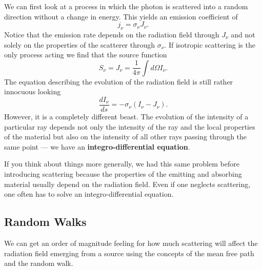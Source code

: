 We can first look at a process in which the photon is scattered into
a random direction without a change in energy.  This yields an
emission coefficient of 
\begin{equation}
j_\nu = \sigma_\nu J_\nu.
\label{eq:86}
\end{equation}
Notice that the emission rate depends on the radiation field through
$J_\nu$ and not solely on the properties of the scatterer through
$\sigma_\nu$.  If isotropic scattering is the only process acting we
find that the source function
\begin{equation}
S_\nu = J_\nu = \frac{1}{4\pi} \int d\Omega I_\nu.
\label{eq:87}
\end{equation}
The equation describing the evolution of the radiation field is still
rather innocuous looking 
\begin{equation}
\frac{d I_\nu}{ds} = -\sigma_\nu \left ( I_\nu - J_\nu \right ).
\label{eq:88}
\end{equation}
However, it is a completely different beast.  The evolution of the
intensity of a particular ray depends not only the intensity of the
ray and the local properties of the material but also on the intensity
of all other rays passing through the same point --- we have an 
{\bf integro-differential equation}.

If you think about things more generally, we had this same problem
before introducing scattering because the properties of the emitting
and absorbing material usually depend on the radiation field.  Even if
one neglects scattering, one often has to solve an
integro-differential equation.

\subsection{Random Walks}
\label{sec:random-walks}
We can get an order of magnitude feeling for how much scattering will
affect the radiation field emerging from a source using the concepts
of the mean free path and the random walk.

